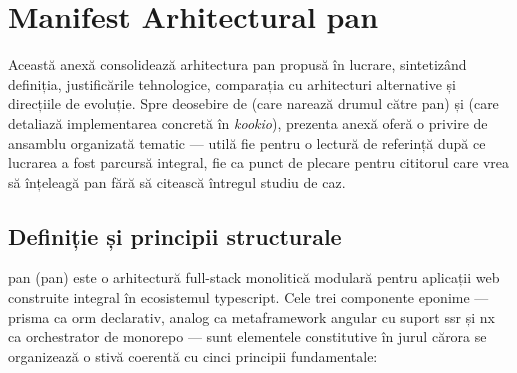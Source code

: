 \raggedbottom

\section{Manifest Arhitectural \acrshort{pan}}\label{anexa:manifest}

Această anexă consolidează arhitectura \gls{pan} propusă în lucrare, sintetizând definiția, justificările tehnologice, comparația cu arhitecturi alternative și direcțiile de evoluție.
Spre deosebire de  (care narează drumul către \gls{pan}) și  (care detaliază implementarea concretă în \textit{\gls{kookio}}), prezenta anexă oferă o privire de ansamblu organizată tematic --- utilă fie pentru o lectură de referință după ce lucrarea a fost parcursă integral, fie ca punct de plecare pentru cititorul care vrea să înțeleagă \gls{pan} fără să citească întregul studiu de caz.

\subsection{Definiție și principii structurale}\label{subsec:pan-definitie}

\gls{pan} (\acrlong{pan}) este o arhitectură full-stack monolitică modulară pentru aplicații \gls{web} construite integral în ecosistemul \gls{typescript}.
Cele trei componente eponime --- \gls{prisma} ca \gls{orm} declarativ, \gls{analog} ca \gls{metaframework} \gls{angular} cu suport \acrshort{ssr} și \gls{nx} ca orchestrator de \gls{monorepo} --- sunt elementele constitutive în jurul cărora se organizează o stivă coerentă cu cinci principii fundamentale:

